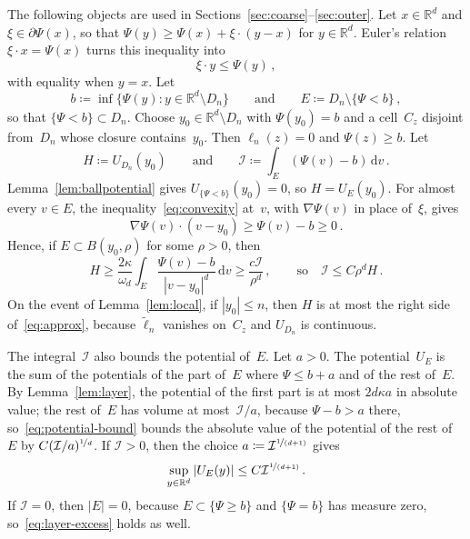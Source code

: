 \documentclass[11pt]{amsart}
\theoremstyle{plain}
\theoremstyle{definition}
\newcommand{\R}{\mathbb R}
\newcommand{\drift}{\kappa}
\newcommand{\gauge}{\Psi}
\newcommand{\dd}{\,\mathrm d}
\newcommand{\nf}{\nicefrac}
\numberwithin{equation}{section}
\begin{document}
The following objects are used in Sections~\ref{sec:coarse}--\ref{sec:outer}. Let $x\in\R^d$ and $\xi\in\partial \gauge(x)$, so that $\gauge(y)\geq \gauge(x)+\xi\cdot(y-x)$ for $y\in\R^d$. Euler's relation $\xi\cdot x=\gauge(x)$ turns this inequality into
\begin{equation}\label{eq:convexity}
\xi\cdot y\leq \gauge(y)\, ,
\end{equation}
with equality when $y=x$. Let
\begin{equation*}
b\coloneqq\inf\{\gauge(y):y\in\R^d\setminus D_n\}\qquad\text{and}\qquad
E\coloneqq D_n\setminus\{\gauge<b\}\, ,
\end{equation*}
so that $\{\gauge<b\}\subset D_n$. Choose $y_0\in\overline{\R^d\setminus D_n}$ with $\gauge(y_0)=b$ and a cell~$C_z$ disjoint from~$D_n$ whose closure contains~$y_0$. Then $\ell_n(z)=0$ and $\gauge(z)\geq b$. Let
\begin{equation*}
H\coloneqq U_{D_n}(y_0)\qquad\text{and}\qquad \mathcal I\coloneqq\int_E(\gauge(v)-b)\dd v\, .
\end{equation*}
Lemma~\ref{lem:ballpotential} gives $U_{\{\gauge<b\}}(y_0)=0$, so $H=U_E(y_0)$. For almost every $v\in E$, the inequality~\eqref{eq:convexity} at~$v$, with $\nabla \gauge(v)$ in place of~$\xi$, gives
\begin{equation}\label{eq:contact-convexity}
\nabla \gauge(v)\cdot(v-y_0)\geq \gauge(v)-b\geq0\, .
\end{equation}
Hence, if $E\subset B(y_0,\rho)$ for some $\rho>0$, then
\begin{equation}\label{eq:norm-excess}
H\geq\frac{2\drift}{\omega_d}\int_E\frac{\gauge(v)-b}{|v-y_0|^d}\dd v\geq\frac{c\mathcal I}{\rho^d}\, ,\qquad\text{so}\quad \mathcal I\leq C\rho^dH\, .
\end{equation}
On the event of Lemma~\ref{lem:local}, if $|y_0|\leq n$, then $H$ is at most the right side of~\eqref{eq:approx}, because $\widetilde\ell_n$ vanishes on~$C_z$ and $U_{D_n}$ is continuous.

The integral~$\mathcal I$ also bounds the potential of~$E$. Let $a>0$. The potential~$U_E$ is the sum of the potentials of the part of~$E$ where $\gauge\leq b+a$ and of the rest of~$E$. By Lemma~\ref{lem:layer}, the potential of the first part is at most $2d\drift a$ in absolute value; the rest of~$E$ has volume at most~$\mathcal I/a$, because $\gauge-b>a$ there, so~\eqref{eq:potential-bound} bounds the absolute value of the potential of the rest of~$E$ by $C(\mathcal I/a)^{\nf1d}$. If $\mathcal I>0$, then the choice $a\coloneqq \mathcal I^{\nf{1}{(d+1)}}$ gives
\begin{equation}\label{eq:layer-excess}
\sup_{y\in\R^d}|U_E(y)|\leq C\mathcal I^{\nf{1}{(d+1)}}\, .
\end{equation}
If $\mathcal I=0$, then $|E|=0$, because $E\subset\{\gauge\geq b\}$ and $\{\gauge=b\}$ has measure zero, so~\eqref{eq:layer-excess} holds as well.
\end{document}
